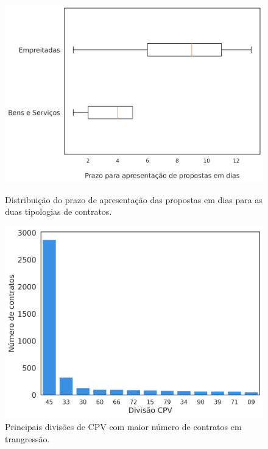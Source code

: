 \begin{figure}[H]
	\centering
	\begin{minipage}{.48\linewidth}
		\includegraphics[width=\linewidth]{imagens/r003/boxplot_prazos.png}
		\caption{Distribuição do prazo de apresentação das propostas em dias para as duas tipologias de contratos.}
		
	\end{minipage}
	\hfill
	\begin{minipage}{.48\linewidth}
		\includegraphics[width=\linewidth]{imagens/r003/main_cpvs.png}
		\caption{Principais divisões de CPV com maior número de contratos em trangressão.}
		
	\end{minipage}
\end{figure}

